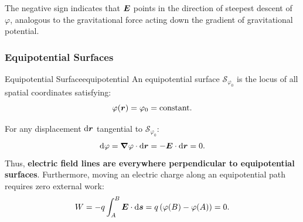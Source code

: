The negative sign indicates that $\vb*{E}$ points in the direction of steepest descent of $\varphi$, analogous to the gravitational force acting down the gradient of gravitational potential.

\subsubsection{Equipotential Surfaces}

\begin{definition}{Equipotential Surface}{equipotential}
An equipotential surface $\mathcal{S}_{\varphi_0}$ is the locus of all spatial coordinates satisfying:
\begin{equation}
    \varphi(\vb*{r}) = \varphi_0 = \text{constant}.
\end{equation}
\end{definition}

For any displacement $\dd{\vb*{r}}$ tangential to $\mathcal{S}_{\varphi_0}$:
\begin{equation}
    \dd{\varphi} = \grad{\varphi} \cdot \dd{\vb*{r}} = -\vb*{E} \cdot \dd{\vb*{r}} = 0.
\end{equation}
Thus, \textbf{electric field lines are everywhere perpendicular to equipotential surfaces}. Furthermore, moving an electric charge along an equipotential path requires zero external work:
\begin{equation}
    W = -q \int_{A}^{B} \vb*{E} \cdot \dd{\vb*{s}} = q \left(\varphi(B) - \varphi(A)\right) = 0.
\end{equation}

\begin{center}
\end{center}

